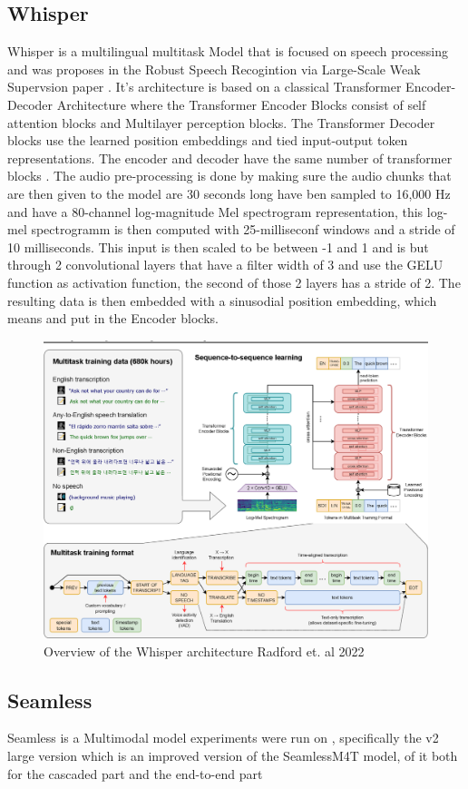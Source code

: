 \subsection{Whisper}
Whisper is a multilingual multitask Model that is focused on speech processing and was proposes in the Robust Speech Recogintion via Large-Scale Weak Supervsion paper \cite{radford2022robust}. 
It's architecture is based on a classical Transformer Encoder-Decoder Architecture where the Transformer Encoder Blocks consist of self attention blocks and Multilayer perception blocks. 
The Transformer Decoder blocks use the learned position embeddings and tied input-output token representations. 
The encoder and decoder have the same number of transformer blocks .
The audio pre-processing is done by making sure the audio chunks that are then given to the model are 30 seconds long have ben sampled to 16,000 Hz and have a 80-channel log-magnitude Mel spectrogram representation, this log-mel spectrogramm is then computed with 25-milliseconf windows and a stride of 10 milliseconds. 
This input is then scaled to be between -1 and 1 and is but through 2 convolutional layers that have a filter width of 3 and use the GELU function as activation function, the second of those 2 layers has a stride of 2. 
The resulting data is then embedded with a sinusodial position embedding, which means %
and put in the Encoder blocks. 

\begin{figure}
        \centering%
        \includegraphics[width=0.5\linewidth]{Latex//sections//images/whispermodel.png}
        \caption{Overview of the Whisper architecture Radford et. al 2022}
        \label{fig:whispermodel}
    \end{figure}

\subsection{Seamless}

Seamless is a Multimodal model 
experiments were run on \cite{seamless2023}, specifically the v2 large version which is an improved version of the SeamlessM4T model, 
of it both for the cascaded part and the end-to-end part

